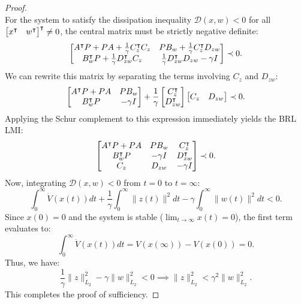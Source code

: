\begin{proof}
\begin{equation}
\end{equation}
For the system to satisfy the dissipation inequality $\mathcal{D}(x, w) < 0$ for all $\begin{bmatrix} x^\intercal & w^\intercal \end{bmatrix}^\intercal \neq 0$, the central matrix must be strictly negative definite:
\begin{equation}
    \begin{bmatrix} A^\intercal P + P A + \frac{1}{\gamma} C_z^\intercal C_z & P B_w + \frac{1}{\gamma} C_z^\intercal D_{zw} \\ B_w^\intercal P + \frac{1}{\gamma} D_{zw}^\intercal C_z & \frac{1}{\gamma} D_{zw}^\intercal D_{zw} - \gamma I \end{bmatrix} \prec 0 . \label{eq:brl_proof_schur_pre}
\end{equation}
We can rewrite this matrix by separating the terms involving $C_z$ and $D_{zw}$:
\begin{equation}
\begin{bmatrix} A^\intercal P + P A & P B_w \\ B_w^\intercal P & -\gamma I \end{bmatrix} + \frac{1}{\gamma} \begin{bmatrix} C_z^\intercal \\ D_{zw}^\intercal \end{bmatrix} \begin{bmatrix} C_z & D_{zw} \end{bmatrix} \prec 0 .
\end{equation}
Applying the Schur complement to this expression immediately yields the BRL LMI:
\begin{equation}
\begin{bmatrix} A^\intercal P + P A & P B_w & C_z^\intercal \\ B_w^\intercal P & -\gamma I & D_{zw}^\intercal \\ C_z & D_{zw} & -\gamma I \end{bmatrix} \prec 0 .
\end{equation}
Now, integrating $\mathcal{D}(x, w) < 0$ from $t = 0$ to $t = \infty$:
\begin{equation}
\int_0^\infty \dot{V}(x(t)) dt + \frac{1}{\gamma} \int_0^\infty \| z(t) \|^2 dt - \gamma \int_0^\infty \| w(t) \|^2 dt < 0 .
\end{equation}
Since $x(0) = 0$ and the system is stable ($\lim_{t\to\infty} x(t) = 0$), the first term evaluates to:
\begin{equation}
\int_0^\infty \dot{V}(x(t)) dt = V(x(\infty)) - V(x(0)) = 0 .
\end{equation}
Thus, we have:
\begin{equation}
\frac{1}{\gamma} \| z \|_{L_2}^2 - \gamma \| w \|_{L_2}^2 < 0 \implies \| z \|_{L_2}^2 < \gamma^2 \| w \|_{L_2}^2 .
\end{equation}
This completes the proof of sufficiency.
\end{proof}

